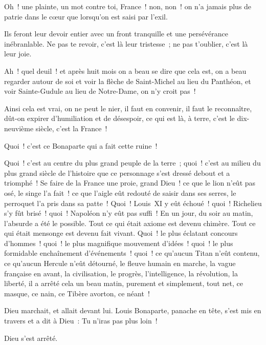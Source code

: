 \documentclass[french,twoside]{book} %
\begin{document}
Oh ! une plainte, un mot contre toi, France ! non, non ! on n’a jamais plus de patrie dans le cœur que lorsqu’on est saisi par l’exil.\par
Ils feront leur devoir entier avec un front tranquille et une persévérance inébranlable. Ne pas te revoir, c’est là leur tristesse ; ne pas t’oublier, c’est là leur joie.\par
Ah ! quel deuil ! et après huit mois on a beau se dire que cela est, on a beau regarder autour de soi et voir la flèche de Saint-Michel au lieu du Panthéon, et voir Sainte-Gudule au lieu de Notre-Dame, on n’y croit pas !\par
Ainsi cela est vrai, on ne peut le nier, il faut en convenir, il faut le reconnaître, dût-on expirer d’humiliation et de désespoir, ce qui est là, à terre, c’est le dix-neuvième siècle, c’est la France !\par
Quoi ! c’est ce Bonaparte qui a fait cette ruine !\par
Quoi ! c’est au centre du plus grand peuple de la terre ; quoi ! c’est au milieu du plus grand siècle de l’histoire que ce personnage s’est dressé debout et a triomphé ! Se faire de la France une proie, grand Dieu ! ce que le lion n’eût pas osé, le singe l’a fait ! ce que l’aigle eût redouté de saisir dans ses serres, le perroquet l’a pris dans sa patte ! Quoi ! Louis XI y eût échoué ! quoi ! Richelieu s’y fût brisé ! quoi ! Napoléon n’y eût pas suffi ! En un jour, du soir au matin, l’absurde a été le possible. Tout ce qui était axiome est devenu chimère. Tout ce qui était mensonge est devenu fait vivant. Quoi ! le plus éclatant concours d’hommes ! quoi ! le plus magnifique mouvement d’idées ! quoi ! le plus formidable enchaînement d’événements ! quoi ! ce qu’aucun Titan n’eût contenu, ce qu’aucun Hercule n’eût détourné, le fleuve humain en marche, la vague française en avant, la civilisation, le progrès, l’intelligence, la révolution, la liberté, il a arrêté cela un beau matin, purement et simplement, tout net, ce masque, ce nain, ce Tibère avorton, ce néant !\par
Dieu marchait, et allait devant lui. Louis Bonaparte, panache en tête, s’est mis en travers et a dit à Dieu : Tu n’iras pas plus loin !\par
Dieu s’est arrêté.\par
\end{document}
